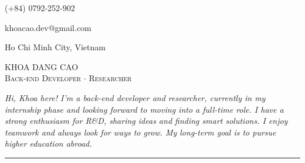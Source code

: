 \documentclass[a4paper, 10pt]{article}
\begin{document}
\begin{flushright}
  \item {\Calluna (+84) 0792-252-902}  %
  \item {\Calluna khoacao.dev@gmail.com}  %
  \item {\Calluna Ho Chi Minh City, Vietnam}  %
\end{flushright}\vspace{-60pt}

\begin{flushleft}
  {\Calluna \fontsize{30pt}{0pt}\selectfont \textsc{KHOA DANG CAO}} \\
  \vspace{5pt}
  {\Calluna \fontsize{10pt}{30pt}\selectfont \textsc{Back-end Developer} \hspace{5pt} $\cdot$ \hspace{5pt} \textsc{Researcher} \hspace{5pt}}

\vspace{10pt}
  \noindent
    \begin{justify}
    \textit{Hi, Khoa here! I’m a back-end developer and researcher, currently in my internship phase and looking forward to moving into a full-time role. I have a strong enthusiasm for R\&D, sharing ideas and finding smart solutions. I enjoy teamwork and always look for ways to grow. My long-term goal is to pursue higher education abroad.}
    \end{justify}
    \noindent\rule{\textwidth}{0.3pt}
\end{flushleft}


\end{document}
